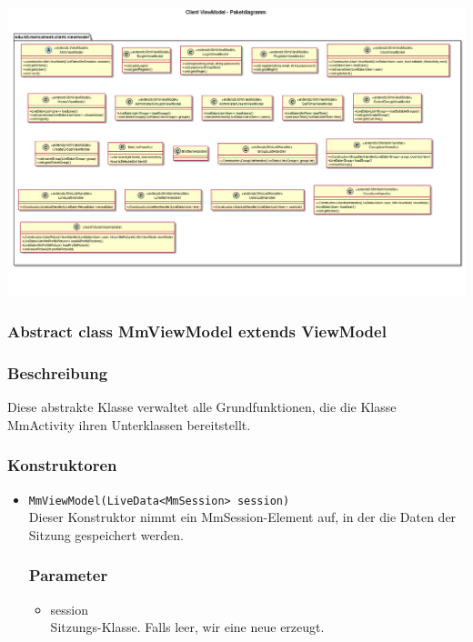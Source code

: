 \documentclass[a4paper]{scrreprt}
\begin{document}
\begin{center}
	\includegraphics[width=1.1\textwidth]{GUI/frontend-package-viewmodel.png}
\end{center} 

\subsubsection{Abstract class MmViewModel extends ViewModel}
\subsubsection*{Beschreibung}
Diese abstrakte Klasse verwaltet alle Grundfunktionen, die die Klasse MmActivity ihren Unterklassen bereitstellt.


\subsubsection*{Konstruktoren}
\begin{addmargin}[25pt]{0pt}
\begin{itemize}

\item \texttt{MmViewModel(LiveData<MmSession> session)}\\
	
	Dieser Konstruktor nimmt ein MmSession-Element auf, in der die Daten der Sitzung gespeichert werden.

	\subsubsection*{Parameter}
	\begin{itemize}
	\item session \\
		Sitzungs-Klasse. Falls leer, wir eine neue erzeugt.
	\end{itemize}

\end{itemize}
\end{addmargin}
\end{document}
